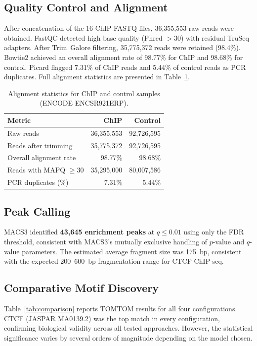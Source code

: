 \documentclass[12pt]{article}
\begin{document}
\subsection{Quality Control and Alignment}

After concatenation of the 16 ChIP FASTQ files, 36,355,553 raw reads were
obtained. FastQC detected high base quality (Phred $> 30$) with residual
TruSeq adapters. After Trim~Galore filtering, 35,775,372 reads were retained
(98.4\%). Bowtie2 achieved an overall alignment rate of 98.77\% for ChIP and
98.68\% for control. Picard flagged 7.31\% of ChIP reads and 5.44\% of control
reads as PCR duplicates. Full alignment statistics are presented in
Table~\ref{tab:alignment}.

\begin{table}[htbp]
\centering
\caption{Alignment statistics for ChIP and control samples (ENCODE ENCSR921ERP).}
\label{tab:alignment}
\small
\begin{tabular}{lrr}
\toprule
\textbf{Metric} & \textbf{ChIP} & \textbf{Control} \\
\midrule
Raw reads                  & 36,355,553  & 92,726,595 \\
Reads after trimming       & 35,775,372  & 92,726,595 \\
Overall alignment rate     & 98.77\%     & 98.68\%    \\
Reads with MAPQ $\geq 30$  & 35,295,000  & 80,007,586 \\
PCR duplicates (\%)        & 7.31\%      & 5.44\%     \\
\bottomrule
\end{tabular}
\end{table}

\subsection{Peak Calling}

MACS3 identified \textbf{43,645 enrichment peaks} at $q \leq 0.01$ using
only the FDR threshold, consistent with MACS3's mutually exclusive handling
of $p$-value and $q$-value parameters. The estimated average fragment size
was 175~bp, consistent with the expected 200--600~bp fragmentation range
for CTCF ChIP-seq.

\subsection{Comparative Motif Discovery}

Table~\ref{tab:comparison} reports TOMTOM results for all four configurations.
CTCF (JASPAR MA0139.2) was the top match in every configuration, confirming
biological validity across all tested approaches. However, the statistical
significance varies by several orders of magnitude depending on the model chosen.
\end{document}
